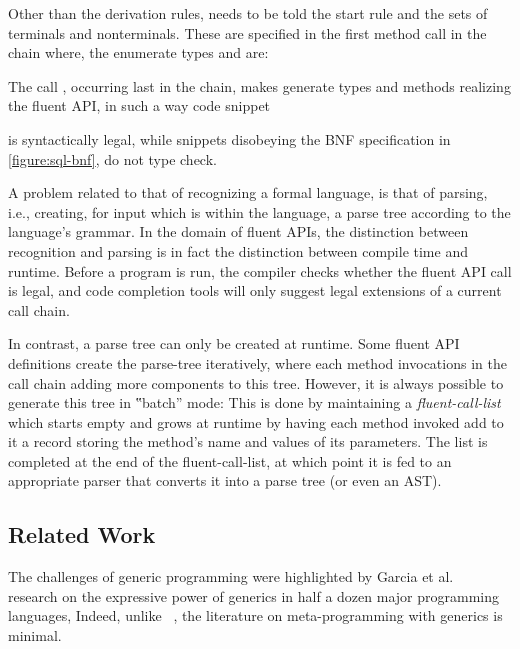 Other than the derivation rules, \Fajita  needs to be told the start rule
  and the sets of terminals and nonterminals.
These are specified in the first method call in the chain where, 
  the enumerate types  and  are:

\begin{quote}
  \parbox[c]{43ex}{}
\end{quote}

The call , occurring last in the chain, makes 
\Fajita generate types and methods realizing the fluent API,
 in such a way code snippet 
\begin{quote}
  \parbox[c]{43ex}{}
\end{quote}
is syntactically legal, while snippets disobeying the BNF specification 
in \cref{figure:sql-bnf}, do not type check.

A problem related to that of recognizing a formal language,
is that of parsing, i.e., creating, for input which is within the language,
a parse tree according to the language's grammar.
In the domain of fluent APIs, the distinction between recognition and parsing
is in fact the distinction between compile time and runtime.
Before a program is run, the compiler checks whether the fluent API call is
legal, and code completion tools will only suggest legal extensions of a
current call chain.

In contrast, a parse tree can only be created at runtime.
Some fluent API definitions create the parse-tree
iteratively, where each method invocations in the call chain adding
more components to this tree.
However, it is always possible to generate this tree in ‟batch” mode:
This is done by maintaining a \emph{fluent-call-list} which
starts empty and grows at runtime by having each method invoked add to it
a record storing the method's name and values of its parameters.
The list is completed at the end of the fluent-call-list, at which point it is
fed to an appropriate parser that converts it into a parse tree (or even an
AST).

\subsection{Related Work}
The challenges of \Java generic programming were highlighted by Garcia et
al.~\cite{Garcia:Jarvi:Lumsdaine:Siek:Willcock:03} research on the expressive
power of generics in half a dozen major programming languages, 
Indeed, unlike \CC~\cite{Austern:1998,Musser:Stepanov:1989,
Backhouse:Jansson:1999, Dehnert:Stepanov:2000,Gil:Gutterman:98,Abrahams:Gurtovoy:04}, the literature on meta-programming with \Java
generics is minimal. 

